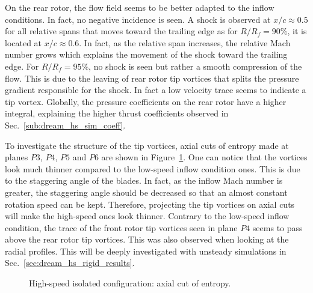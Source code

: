 On the rear rotor, the flow field seems to be better adapted to
the inflow conditions. In fact, no negative incidence is seen.
A shock is observed at $x/c \approx 0.5$ for all relative spans
that moves toward the trailing edge as
for $R / R_f = 90 \%$, it is located at $x/c \approx 0.6$.
In fact, as the relative span increases, the relative Mach
number grows which explains the movement of the shock
toward the trailing edge.
For $R / R_f = 95 \%$, no shock is seen but rather a smooth
compression of the flow. This is due to the 
leaving of rear rotor tip vortices that splits the
pressure gradient responsible for the shock.
In fact a low velocity trace seems to indicate
a tip vortex. Globally, the pressure coefficients on the 
rear rotor have a higher integral, explaining
the higher thrust coefficients observed in Sec.~\ref{sub:dream_hs_sim_coeff}.

To investigate the structure of the tip vortices, axial
cuts of entropy made at planes $P3$, $P4$, $P5$ and $P6$
are shown in Figure~\ref{fig:dream_HS_steady_entropy}. One can notice
that the vortices look much thinner compared to the
low-speed inflow condition ones. This is due to the
staggering angle of the blades. In fact, as the inflow 
Mach number is greater, the staggering angle should be
decreased so that an almost constant rotation speed can be kept.
Therefore, projecting the tip vortices on axial cuts will make
the high-speed ones look thinner. Contrary to the low-speed
inflow condition, the trace of the front rotor tip vortices
seen in plane $P4$ seems to pass above the rear rotor tip
vortices. This was also observed when looking at the radial profiles.
This will be deeply investigated with unsteady simulations
in Sec.~\ref{sec:dream_hs_rigid_results}.
\begin{figure}[htp]
  \centering
  \caption{High-speed isolated configuration: axial cut of entropy.}
   \label{fig:dream_HS_steady_entropy}
\end{figure}